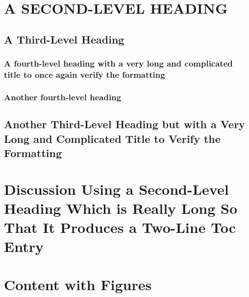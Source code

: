 


\lipsum[6]

\section{A SECOND-LEVEL HEADING}
\lipsum[7-9]

\subsection{A Third-Level Heading}
\lipsum[10]
\subsubsection{A fourth-level heading with a very long and complicated title
to once again verify the formatting}
\lipsum[10-12]
\subsubsection{Another fourth-level heading}
\lipsum[10-12]

\subsection{Another Third-Level Heading but with a Very Long and
  Complicated Title to Verify the Formatting}
\lipsum[13-15]

\section{Discussion Using a Second-Level Heading
  Which is Really Long So That It Produces a Two-Line
  Toc Entry}
\lipsum[10-12]

\section{Content with Figures}
\lipsum[10]

